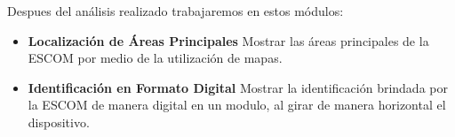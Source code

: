 Despues del análisis realizado trabajaremos en estos módulos:

\begin{itemize}
	\item \textbf{Localización de Áreas Principales} Mostrar las áreas principales de la ESCOM por medio de la utilización de mapas.
	
	\item \textbf{Identificación en Formato Digital} Mostrar la identificación brindada por la ESCOM de manera digital en un modulo, al girar de manera horizontal el dispositivo.	
\end{itemize}

